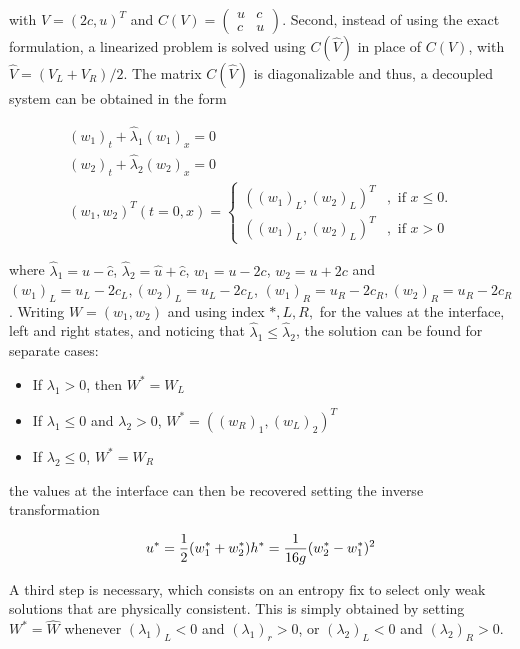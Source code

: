 \noindent with $V = (2c,u)^T$ and 
$C(V) = \left( 
\begin{array}{cc} 
u & c \\ 
c & u \end{array}\right)$. Second, instead of using the exact formulation, a linearized problem is solved using $C(\hat V)$ in place of $C(V)$, with $\hat V = (V_L +V_R)/2$. The matrix $C(\hat V)$ is diagonalizable and thus, a decoupled system can be obtained in the form

\begin{equation}
	\begin{split}
		(w_1)_t + \hat \lambda_1 (w_1)_x = 0\\
		(w_2)_t + \hat \lambda_2 (w_2)_x = 0 \\	
	(w_1,w_2)^T(t=0,x) = \begin{cases}
		((w_1)_L,(w_2)_L)^T &, \text{ if } x\leq 0. \\
		((w_1)_L,(w_2)_L)^T &, \text{ if } x > 0 
		\end{cases}
	\end{split}
\end{equation}

\noindent where $\hat \lambda_1 = \hat u - \hat c$, $\hat \lambda_2 = \hat u + \hat c$, $w_1 = u-2c$, $w_2 = u+2c$ and $ (w_1)_L = u_L - 2c_L, (w_2)_L = u_L - 2c_L$, $ (w_1)_R = u_R - 2c_R, (w_2)_R = u_R - 2c_R$. Writing $W=(w_1,w_2)$ and using index $*,L,R,$ for the values at the interface, left and right states, and noticing that $\hat \lambda_1 \leq \hat \lambda_2$, the solution can be found for separate cases:

\begin{itemize}
	\item If $\lambda_1 > 0$, then $W^* = W_L$
	\item If $\lambda_1 \leq 0 $ and $\lambda_2>0$, $W^* = ((w_R)_1, (w_L)_2)^T$
	\item If $\lambda_2\leq 0 $, $W^* = W_R$
\end{itemize}

\noindent the values at the interface can then be recovered setting the inverse transformation 

\begin{equation}
	u^* = \frac{1}{2}(w^*_1+w^*_2) \\
	h^* = \frac{1}{16g}(w^*_2-w^*_1)^2
	\label{serre:riemman_solution}
\end{equation}

A third step is necessary, which consists on an entropy fix to select only weak solutions that are physically consistent. This is simply obtained by setting $W^* = \hat W$ whenever $(\lambda_1)_L < 0$ and $(\lambda_1)_r >0$, or $(\lambda_2)_L < 0 $ and $(\lambda_2)_R>0$.

